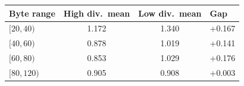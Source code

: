 \begin{tabular}{lccl}
\toprule
Byte range & High div.\ mean & Low div.\ mean & Gap \\
\midrule
$[20, 40)$ & 1.172 & 1.340 & +0.167 \\
$[40, 60)$ & 0.878 & 1.019 & +0.141 \\
$[60, 80)$ & 0.853 & 1.029 & +0.176 \\
$[80, 120)$ & 0.905 & 0.908 & +0.003 \\
\bottomrule
\end{tabular}
